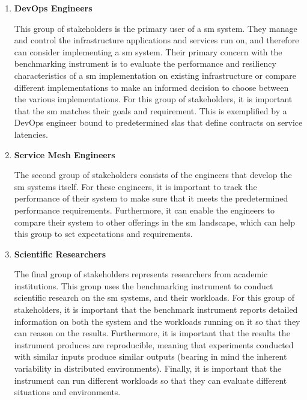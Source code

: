 \begin{enumerate}[label=\textbf{S\arabic*}, leftmargin=3\parindent]
    \item \textbf{DevOps Engineers}
    \label{sh-1}
    
    This group of stakeholders is the primary user of a \gls{sm} system. They manage and control the infrastructure applications and services run on, and therefore can consider implementing a \gls{sm} system. Their primary concern with the benchmarking instrument is to evaluate the performance and resiliency characteristics of a \gls{sm} implementation on existing infrastructure or compare different implementations to make an informed decision to choose between the various implementations. For this group of stakeholders, it is important that the \gls{sm} matches their goals and requirement. This is exemplified by a DevOps engineer bound to predetermined \glspl{sla} that define contracts on service latencies.
    
    \item \textbf{Service Mesh Engineers}
    \label{sh-2}
    
    The second group of stakeholders consists of the engineers that develop the \gls{sm} systems itself. For these engineers, it is important to track the performance of their system to make sure that it meets the predetermined performance requirements. Furthermore, it can enable the engineers to compare their system to other offerings in the \gls{sm} landscape, which can help this group to set expectations and requirements.
    
    \item \textbf{Scientific Researchers}
    \label{sh-3}
    
    The final group of stakeholders represents researchers from academic institutions. This group uses the benchmarking instrument to conduct scientific research on the \gls{sm} systems, and their workloads. For this group of stakeholders, it is important that the benchmark instrument reports detailed information on both the system and the workloads running on it so that they can reason on the results.  Furthermore, it is important that the results the instrument produces are reproducible, meaning that experiments conducted with similar inputs produce similar outputs (bearing in mind the inherent variability in distributed environments). Finally, it is important that the instrument can run different workloads so that they can evaluate different situations and environments.
\end{enumerate}


